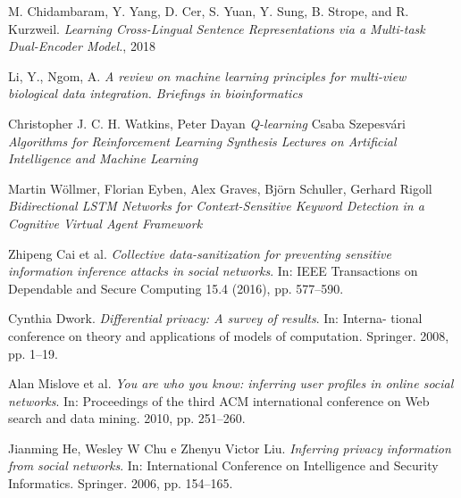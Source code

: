 \begin{thebibliography}{9}
M. Chidambaram, Y. Yang, D. Cer, S. Yuan, Y. Sung, B. Strope, and R. Kurzweil. \newline
\textit{Learning Cross-Lingual Sentence Representations via a Multi-task Dual-Encoder Model.}, 2018

Li, Y., Ngom, A.\newline
\textit{A review on machine learning principles for multi-view biological data integration. Briefings in bioinformatics}

Christopher J. C. H. Watkins, Peter Dayan\newline
\textit{Q-learning}
Csaba Szepesvári\newline
\textit{Algorithms for Reinforcement Learning
Synthesis Lectures on Artificial Intelligence and Machine Learning}

Martin Wöllmer, Florian Eyben, Alex Graves, Björn Schuller, Gerhard Rigoll \newline
\textit{Bidirectional LSTM Networks for Context-Sensitive Keyword Detection in a Cognitive Virtual Agent Framework}

Zhipeng Cai et al.\newline
\textit{Collective data-sanitization for preventing sensitive information inference attacks in social networks}.\newline
In: IEEE Transactions on Dependable and Secure Computing 15.4 (2016), pp. 577–590.

Cynthia Dwork.\newline
\textit{Differential privacy: A survey of results}.\newline
In: Interna- tional conference on theory and applications of models of computation. Springer. 2008, pp. 1–19.

Alan Mislove et al. \newline
\textit{You are who you know: inferring user profiles in online social networks}.\newline
In: Proceedings of the third ACM international conference on Web search and data mining. 2010, pp. 251–260.

Jianming He, Wesley W Chu e Zhenyu Victor Liu. \newline
\textit{Inferring privacy information from social networks}.\newline
In: International Conference on Intelligence and Security Informatics. Springer. 2006, pp. 154–165.


\end{thebibliography}
